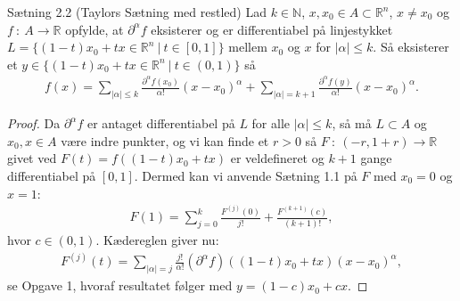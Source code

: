 \begin{boks}{Sætning 2.2 (Taylors Sætning med restled)}
  Lad $k \in \mathbb{N}$, $x,x_0 \in A \subset \mathbb{R}^n$, $x \neq x_0$ og $f \ : \ A \rightarrow \mathbb{R}$ opfylde, at $\partial^\alpha f$ eksisterer og er differentiabel på linjestykket $L = \{(1 - t)x_0 + tx \in \mathbb{R}^n \ | \ t \in [0,1]\}$ mellem $x_0$ og $x$ for $|\alpha| \leq k$.
  Så eksisterer et $y \in \{(1 - t)x_0 + tx \in \mathbb{R}^n \ | \ t \in (0,1)\}$ så
  \begin{align*}
    f(x) = \sum_{|\alpha| \leq k} \frac{\partial^\alpha f(x_0)}{\alpha!}(x - x_0)^\alpha + \sum_{|\alpha| = k + 1}\frac{\partial^\alpha f(y)}{\alpha!}(x - x_0)^\alpha.
  \end{align*}
\end{boks}
\begin{proof}
  Da $\partial^\alpha f$ er antaget differentiabel på $L$ for alle $|\alpha| \leq k$, så må $L \subset A$ og $x_0, x \in A$ være indre punkter, og vi kan finde et $r > 0$ så $F \ : \ (-r, 1 + r) \rightarrow \mathbb{R}$ givet ved $F(t) = f((1-t)x_0 + tx)$ er veldefineret og $k + 1$ gange differentiabel på $[0,1]$. Dermed kan vi anvende Sætning 1.1 på $F$ med $x_0 = 0$ og $x = 1$:
  \begin{align*}
    F(1) = \sum_{j = 0}^k \frac{F^{(j)}(0)}{j!} + \frac{F^{(k + 1)}(c)}{(k + 1)!},
  \end{align*}
  hvor $c \in (0,1)$. Kædereglen giver nu:
  \begin{align*}
    F^{(j)}(t) = \sum_{|\alpha| = j} \frac{j!}{\alpha!}(\partial^\alpha f)((1-t)x_0 + tx)(x - x_0)^\alpha,
  \end{align*}
  se Opgave 1, hvoraf resultatet følger med $y = (1 - c)x_0 + cx$.
\end{proof}

